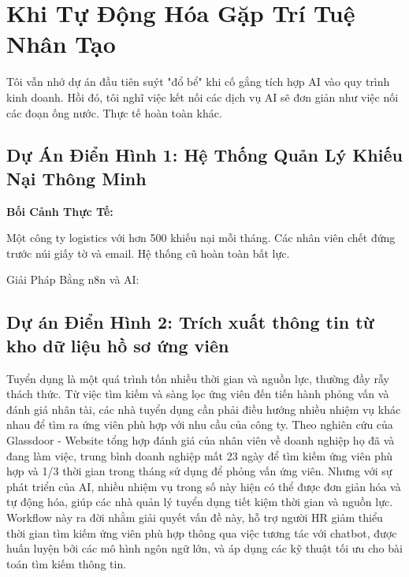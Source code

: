 \section{Khi Tự Động Hóa Gặp Trí Tuệ Nhân Tạo}
Tôi vẫn nhớ dự án đầu tiên suýt "đổ bể" khi cố gắng tích hợp AI vào quy trình kinh doanh. Hồi đó, tôi nghĩ việc kết nối các dịch vụ AI sẽ đơn giản như việc nối các đoạn ống nước. Thực tế hoàn toàn khác.


\subsection{Dự Án Điển Hình 1: Hệ Thống Quản Lý Khiếu Nại Thông Minh}
\textbf{Bối Cảnh Thực Tế:}

Một công ty logistics với hơn 500 khiếu nại mỗi tháng. Các nhân viên chết đứng trước núi giấy tờ và email. Hệ thống cũ hoàn toàn bất lực.

Giải Pháp Bằng n8n và AI:



\subsection{Dự án Điển Hình 2: Trích xuất thông tin từ kho dữ liệu hồ sơ ứng viên}



Tuyển dụng là một quá trình tốn nhiều thời gian và nguồn lực, thường đầy rẫy thách thức. Từ việc tìm kiếm và sàng lọc ứng viên đến tiến hành phỏng vấn và đánh giá nhân tài, các nhà tuyển dụng cần phải điều hướng nhiều nhiệm vụ khác nhau để tìm ra ứng viên phù hợp với nhu cầu của công ty. Theo nghiên cứu của Glassdoor - Website tổng hợp đánh giá của nhân viên về doanh nghiệp họ đã và đang làm việc, trung bình doanh nghiệp mất 23 ngày để tìm kiếm ứng viên phù hợp và 1/3 thời gian trong tháng sử dụng để phỏng vấn ứng viên. Nhưng với sự phát triển của AI, nhiều nhiệm vụ trong số này hiện có thể được đơn giản hóa và tự động hóa, giúp các nhà quản lý tuyển dụng tiết kiệm thời gian và nguồn lực. Workflow này ra đời nhằm giải quyết vấn đề này, hỗ trợ người HR giảm thiểu thời gian tìm kiếm ứng viên phù hợp thông qua việc tương tác với chatbot, được huấn luyện bởi các mô hình ngôn ngữ lớn, và áp dụng các kỹ thuật tối ưu cho bài toán tìm kiếm thông tin.













